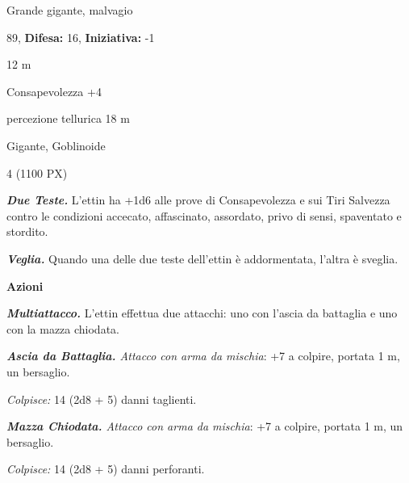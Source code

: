 \begin{multicols}{2}
{
\noindent
\begin{description}[noitemsep, topsep=0pt, parsep=0pt, partopsep=0pt, leftmargin=0cm, labelwidth=2.2cm]
	\item[\textbf{Taglia/Tipo:}] Grande gigante, malvagio
	\item[\textbf{Caratt.:}] 
	\item[\textbf{Punti Ferita:}] 89,  \textbf{Difesa:} 16,  \textbf{Iniziativa:} -1
	\item[\textbf{Movimento:}] 12 m
	\item[\textbf{Tiri Salvez.:}] 
	\item[\textbf{Comp.:}] Consapevolezza +4
	\item[\textbf{Sensi:}] percezione tellurica 18 m
	\item[\textbf{Linguaggi:}] Gigante, Goblinoide
	\item[\textbf{Sfida:}] 4 (1100 PX)\smallskip
\end{description}

\emph{\textbf{Due Teste.}} L'ettin ha +1d6 alle prove di Consapevolezza e sui Tiri Salvezza contro le condizioni accecato, affascinato, assordato, privo di sensi, spaventato e stordito.

\emph{\textbf{Veglia.}} Quando una delle due teste dell'ettin è addormentata, l'altra è sveglia.

\textbf{Azioni}

\emph{\textbf{Multiattacco.}} L'ettin effettua due attacchi: uno con l'ascia da battaglia e uno con la mazza chiodata.

\emph{\textbf{Ascia da Battaglia.} Attacco con arma da mischia}: +7 a colpire, portata 1 m, un bersaglio.

\emph{Colpisce:} 14 (2d8 + 5) danni taglienti.

\emph{\textbf{Mazza Chiodata.} Attacco con arma da mischia}: +7 a colpire, portata 1 m, un bersaglio.

\emph{Colpisce:} 14 (2d8 + 5) danni perforanti.

}
\end{multicols}
